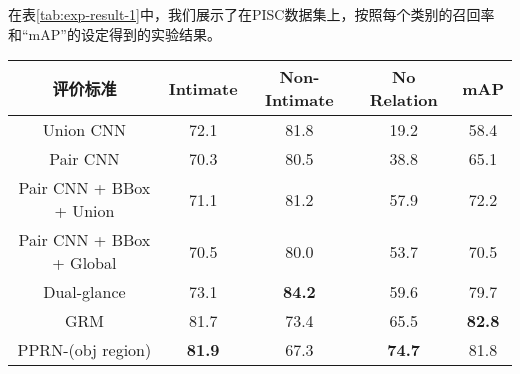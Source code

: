 在表\ref{tab:exp-result-1}中，我们展示了在PISC数据集上，按照每个类别的召回率和``mAP''的设定得到的实验结果。
\begin{table*}[htpb]
  \centering
  \caption{在PISC-coarse上的实验结果，单位为百分比(\%)}
  \label{tab:exp-result-1}
  \begin{tabular}{c|c|c|c|c}
    \toprule
    评价标准 & Intimate & Non-Intimate & No Relation & mAP  \\
    \midrule
    Union CNN \cite{DBLP:conf/eccv/LuKBL16} & 72.1 & 81.8 & 19.2 & 58.4   \\
    \midrule
    Pair CNN \cite{DBLP:conf/iccv/LiWZK17} & 70.3 & 80.5 & 38.8 & 65.1   \\
    \midrule
    Pair CNN + BBox + Union \cite{DBLP:conf/iccv/LiWZK17} & 71.1 & 81.2 & 57.9 & 72.2   \\
    \midrule
    Pair CNN + BBox + Global \cite{DBLP:conf/iccv/LiWZK17} & 70.5 & 80.0 & 53.7 & 70.5  \\
    \midrule
    Dual-glance \cite{DBLP:conf/iccv/LiWZK17} & 73.1 & \textbf{84.2} & 59.6 & 79.7  \\
    \midrule
    GRM \cite{DBLP:conf/ijcai/WangCRYCL18} & 81.7 & 73.4 & 65.5 & \textbf{82.8}   \\
    \midrule
    PPRN-(obj region) & \textbf{81.9} & 67.3 & \textbf{74.7} & 81.8  \\
    \midrule
  \end{tabular}
\end{table*}

